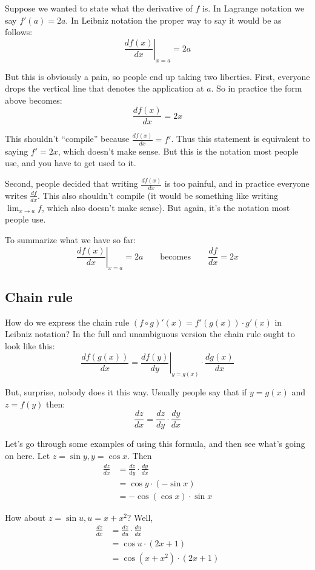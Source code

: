 Suppose we wanted to state what the derivative of $f$ is. In Lagrange
notation we say $f'(a)=2a$. In Leibniz notation the proper way to say
it would be as follows:
\[\left.\frac{df(x)}{dx}\right|_{x=a}=2a\]

But this is obviously a pain, so people end up taking two liberties.
First, everyone drops the vertical line that denotes the application
at $a$. So in practice the form above becomes:
\[\frac{df(x)}{dx}=2x\]

This shouldn't ``compile'' because $\frac{df(x)}{dx}=f'$. Thus this
statement is equivalent to saying $f'=2x$, which doesn't make sense.
But this is the notation most people use, and you have to get used to
it.

\vs

Second, people decided that writing $\frac{df(x)}{dx}$ is too painful,
and in practice everyone writes $\frac{df}{dx}$. This also shouldn't
compile (it would be something like writing $\lim_{x\to a}f$, which also
doesn't make sense). But again, it's the notation most people use.

\vs

To summarize what we have so far:
\[\left.\frac{df(x)}{dx}\right|_{x=a}=2a \qquad\text{becomes}\qquad \frac{df}{dx}=2x\]

\subsection{Chain rule}

How do we express the chain rule $(f\circ g)'(x)=f'(g(x))\cdot g'(x)$ in
Leibniz notation? In the full and unambiguous version the chain rule
ought to look like this:
\[\frac{d f(g(x))}{dx} = \left. \frac{d f(y)}{dy} \right|_{y=g(x)} \cdot
  \frac{d g(x)}{dx}\]

But, surprise, nobody does it this way. Usually people say that if
$y=g(x)$ and $z=f(y)$ then:
\[\frac{dz}{dx}=\frac{dz}{dy}\cdot \frac{dy}{dx}\]

Let's go through some examples of using this formula, and then see
what's going on here. Let $z=\sin y, y=\cos x$. Then
\begin{align*}
  \frac{dz}{dx}&=\frac{dz}{dy}\cdot \frac{dy}{dx}\\
  &=\cos y \cdot (-\sin x)\\
  &=-\cos (\cos x) \cdot \sin x
\end{align*}

How about $z=\sin u, u=x+x^2$? Well,
\begin{align*}
  \frac{dz}{dx}&=\frac{dz}{du}\cdot \frac{du}{dx}\\
               &=\cos u \cdot (2x+1)\\
               &=\cos (x+x^2)\cdot(2x+1)
\end{align*}

